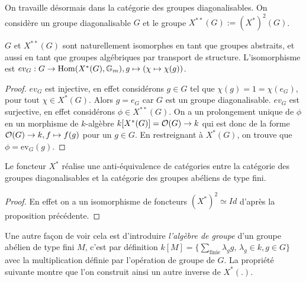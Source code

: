 On travaille désormais dans la catégorie des groupes diagonalisables. On considère un groupe diagonalisable $G$ et le groupe $X^{**}(G):=(X^*)^2(G)$.

\begin{prop}\label{GDiagNatuIsomBidualite}
$G$ et $X^{**}(G)$ sont naturellement isomorphes en tant que groupes abstraits, et aussi en tant que groupes algébriques par transport de structure. L'isomorphisme est $ev_G : G\rightarrow \operatorname{Hom} (X^*(G),\mathbb{G} _m), g\mapsto (\chi\mapsto \chi(g))$.
\end{prop}
\begin{proof}
$ev_G$ est injective, en effet considérons $g\in G$ tel que $\chi(g)=1=\chi(e_G)$, pour tout $\chi\in X^*(G)$. Alors $g=e_G$ car $G$ est un groupe diagonalisable. $ev_G$ est surjective, en effet considérons $\phi\in X^{**}(G)$. On a un prolongement unique de $\phi$ en un morphisme de $k$-algèbre $k[X^*(G)]=\mathcal{O}(G)\rightarrow k$ qui est donc de la forme $\mathcal{O}(G)\rightarrow k, f\mapsto f(g)$ pour un $g\in G$. En restreignant à $X^*(G)$, on trouve que $\phi=\textrm{ev}_G(g)$.
\end{proof}

\begin{cor}\label{EqCatGpDiagGpAb}
Le foncteur $X^*$ réalise une anti-équivalence de catégories entre la catégorie des groupes diagonalisables et la catégorie des groupes abéliens de type fini. 
\end{cor}
\begin{proof}
En effet on a un isomorphisme de foncteurs $(X^*)^2\simeq Id$ d'après la proposition précédente.
\end{proof}

Une autre façon de voir cela est d'introduire \textit{l'algèbre de groupe} d'un groupe abélien de type fini $M$, c'est par définition $k[M]=\lbrace \sum_{\text{finie}} \lambda_gg,\,\lambda_g\in k,g\in G \rbrace$ avec la multiplication définie par l'opération de groupe de $G$. La propriété suivante montre que l'on construit ainsi un autre inverse de $X^*(.)$.

